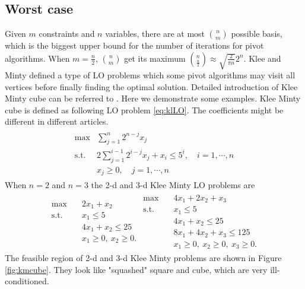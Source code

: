 \documentclass[11pt]{article}
\begin{document}
\subsection{Worst case}
Given $m$ constraints and $n$ variables, there are at most $\binom{n}{m}$ possible basis, which is the biggest upper bound for the number of iterations for pivot algorithms. When $m=\frac{n}{2}$, $\binom{n}{m}$ get its maximum $\binom{n}{\frac{n}{2}}\approx \sqrt{\frac{2}{\pi n}}2^n$. Klee and Minty defined a type of LO problems which some pivot algorithms may visit all vertices before finally finding the optimal solution. Detailed introduction of Klee Minty cube can be referred to \cite{vanderbei2020linear}. Here we demonstrate some examples. Klee Minty cube is defined as following LO problem \ref{eq:klLO}. The coefficients might be different in different articles. 
\begin{align}
\begin{split}
\max &\sum_{j=1}^n 2^{n-j}x_j \\
\text{s.t. } & 2\sum_{j=1}^{i-1}2^{i-j}x_j + x_i \le 5^i, \quad i=1,\cdots,n\\
			&x_j \ge 0,  \quad j=1,\cdots,n
\end{split}\label{eq:klLO}
\end{align} 
When $n=2$ and $n=3$ the 2-d and 3-d Klee Minty LO problems are 
\begin{align*}
\begin{split}
\max \quad & 2x_1 + x_2 \\
\text{s.t. }\quad  & x_1 \le 5\\
& 4x_1 + x_2 \le 25\\
& x_1 \ge 0,\ x_2 \ge 0.
\end{split}
\begin{split}
\max \quad & 4x_1 + 2x_2 + x_3 \\
\text{s.t. }\quad  & x_1 \le 5\\
& 4x_1 + x_2 \le 25\\
& 8x_1 + 4x_2 + x_3 \le 125\\
& x_1 \ge 0,\ x_2 \ge 0, \ x_3 \ge 0.
\end{split}
\end{align*}
The feasible region of 2-d and 3-d Klee Minty problems are shown in Figure \ref{fig:kmcube}. They look like "squashed" square and cube, which are very ill-conditioned.
\end{document}
